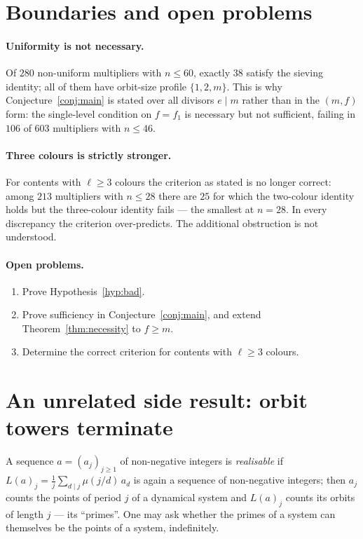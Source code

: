 \documentclass[11pt,a4paper]{article}
\theoremstyle{plain}
\theoremstyle{definition}
\theoremstyle{remark}
\begin{document}
\section{Boundaries and open problems}\label{sec:open}

\paragraph{Uniformity is not necessary.} Of $280$ non-uniform multipliers with $n\le60$,
exactly $38$ satisfy the sieving identity; all of them have orbit-size profile
$\{1,2,m\}$. This is why Conjecture~\ref{conj:main} is stated over all divisors $e\mid m$
rather than in the $(m,f)$ form: the single-level condition on $f=f_1$ is necessary but not
sufficient, failing in $106$ of $603$ multipliers with $n\le46$.

\paragraph{Three colours is strictly stronger.} For contents with $\ell\ge3$ colours the
criterion as stated is no longer correct: among $213$ multipliers with $n\le28$ there are
$25$ for which the two-colour identity holds but the three-colour identity fails --- the
smallest at $n=28$. In every discrepancy the criterion over-predicts. The additional
obstruction is not understood.

\paragraph{Open problems.}
\begin{enumerate}
  \item Prove Hypothesis~\ref{hyp:bad}.
  \item Prove sufficiency in Conjecture~\ref{conj:main}, and extend
        Theorem~\ref{thm:necessity} to $f\ge m$.
  \item Determine the correct criterion for contents with $\ell\ge3$ colours.
\end{enumerate}

\appendix

\section{An unrelated side result: orbit towers terminate}\label{app:tower}

A sequence $a=(a_j)_{j\ge1}$ of non-negative integers is \emph{realisable} if
$L(a)_j=\frac1j\sum_{d\mid j}\mu(j/d)\,a_d$ is again a sequence of non-negative integers;
then $a_j$ counts the points of period $j$ of a dynamical system and $L(a)_j$ counts its
orbits of length $j$ --- its ``primes''. One may ask whether the primes of a system can
themselves be the points of a system, indefinitely.
\end{document}
